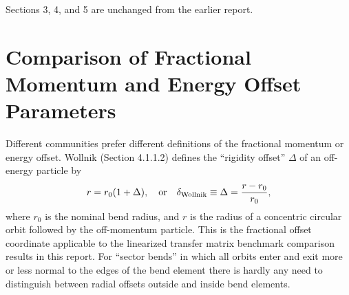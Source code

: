 \documentclass[]{article}
\begin{document}
\noindent
Sections 3, 4, and 5 are unchanged from the earlier report.

\hskip -2cm
\clearpage
\hskip 2cm

\section{Comparison of Fractional Momentum and Energy Offset Parameters}
Different communities prefer different definitions of the fractional
momentum or energy offset.  Wollnik (Section 4.1.1.2) defines the 
``rigidity offset'' $\Delta$ of an off-energy particle by  
%
\begin{equation}
r = r_0(1 + \Delta),
\quad\hbox{or}\quad
\delta_{\rm Wollnik} \equiv \Delta = \frac{r - r_0}{r_0},
\label{eq:Offset.1}
\end{equation}
%
where $r_0$ is the nominal bend radius, and $r$ is the radius of
a concentric circular orbit followed by the off-momentum particle.
This is the fractional offset coordinate applicable to the linearized transfer 
matrix benchmark comparison results in this report.  For ``sector bends'' in 
which all orbits enter and exit more or less normal to the edges of the
bend element there is hardly any need to distinguish between radial
offsets outside and inside bend elements.
\end{document}

